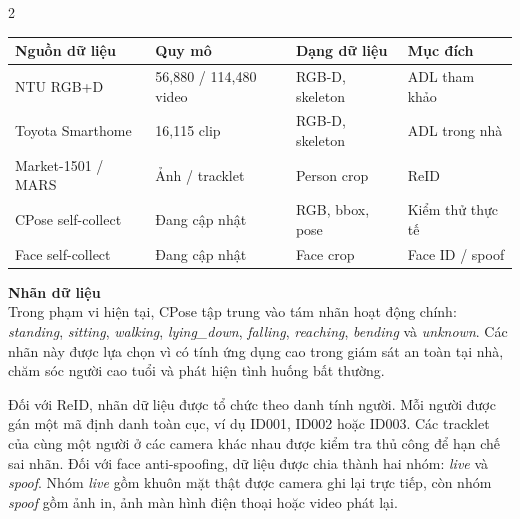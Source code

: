 \documentclass[a4paper, twoside, 12pt]{article}
\begin{document}
\begin{multicols}{2}
\vspace{0.2cm}
\begin{center}
\label{tab:cpose_dataset_summary}
\renewcommand{\arraystretch}{1.2}
\scriptsize
\begin{tabular}{|p{2.6cm}|p{1.8cm}|p{2.2cm}|p{1.4cm}|}
\hline
\textbf{Nguồn dữ liệu} & \textbf{Quy mô} & \textbf{Dạng dữ liệu} & \textbf{Mục đích} \\
\hline
NTU RGB+D & 56,880 / 114,480 video & RGB-D, skeleton & ADL tham khảo \\
\hline
Toyota Smarthome & 16,115 clip & RGB-D, skeleton & ADL trong nhà \\
\hline
Market-1501 / MARS & Ảnh / tracklet & Person crop & ReID \\
\hline
CPose self-collect & Đang cập nhật & RGB, bbox, pose & Kiểm thử thực tế \\
\hline
Face self-collect & Đang cập nhật & Face crop & Face ID / spoof \\
\hline
\end{tabular}
\end{center}

\vspace{0.1cm}
\hspace*{0.5cm}\textbf{Nhãn dữ liệu}\\
Trong phạm vi hiện tại, CPose tập trung vào tám nhãn hoạt động chính: \textit{standing}, \textit{sitting}, \textit{walking}, \textit{lying\_down}, \textit{falling}, \textit{reaching}, \textit{bending} và \textit{unknown}. Các nhãn này được lựa chọn vì có tính ứng dụng cao trong giám sát an toàn tại nhà, chăm sóc người cao tuổi và phát hiện tình huống bất thường.

Đối với ReID, nhãn dữ liệu được tổ chức theo danh tính người. Mỗi người được gán một mã định danh toàn cục, ví dụ ID001, ID002 hoặc ID003. Các tracklet của cùng một người ở các camera khác nhau được kiểm tra thủ công để hạn chế sai nhãn. Đối với face anti-spoofing, dữ liệu được chia thành hai nhóm: \textit{live} và \textit{spoof}. Nhóm \textit{live} gồm khuôn mặt thật được camera ghi lại trực tiếp, còn nhóm \textit{spoof} gồm ảnh in, ảnh màn hình điện thoại hoặc video phát lại.


\end{multicols}
\end{document}

